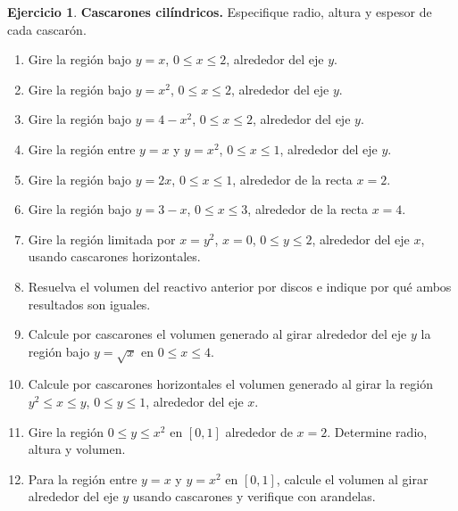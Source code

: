 \documentclass[12pt]{article}
\theoremstyle{definition}
\newtheorem{Ejer}[teorema]{Ejercicio}
\theoremstyle{remark}
\begin{document}
\begin{Ejer}\textbf{Cascarones cilíndricos.} Especifique radio, altura y espesor de cada cascarón.
\begin{enumerate}[resume=banco3]
\item Gire la región bajo $y=x$, $0\le x\le2$, alrededor del eje $y$.
\item Gire la región bajo $y=x^2$, $0\le x\le2$, alrededor del eje $y$.
\item Gire la región bajo $y=4-x^2$, $0\le x\le2$, alrededor del eje $y$.
\item Gire la región entre $y=x$ y $y=x^2$, $0\le x\le1$, alrededor del eje $y$.
\item Gire la región bajo $y=2x$, $0\le x\le1$, alrededor de la recta $x=2$.
\item Gire la región bajo $y=3-x$, $0\le x\le3$, alrededor de la recta $x=4$.
\item Gire la región limitada por $x=y^2$, $x=0$, $0\le y\le2$, alrededor del eje $x$, usando cascarones horizontales.
\item Resuelva el volumen del reactivo anterior por discos e indique por qué ambos resultados son iguales.
\item Calcule por cascarones el volumen generado al girar alrededor del eje $y$ la región bajo $y=\sqrt x$ en $0\le x\le4$.
\item Calcule por cascarones horizontales el volumen generado al girar la región $y^2\le x\le y$, $0\le y\le1$, alrededor del eje $x$.
\item Gire la región $0\le y\le x^2$ en $[0,1]$ alrededor de $x=2$. Determine radio, altura y volumen.
\item Para la región entre $y=x$ y $y=x^2$ en $[0,1]$, calcule el volumen al girar alrededor del eje $y$ usando cascarones y verifique con arandelas.
\end{enumerate}
\end{Ejer}
\end{document}
